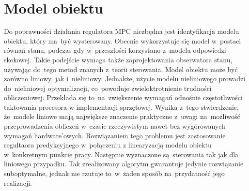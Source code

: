 \section{Model obiektu} \label{sec:model}
Do poprawności działania regulatora MPC niezbędna jest identyfikacja modelu obiektu, który ma~być wysterowany.
Obecnie wykorzystuje się model w~postaci równań stanu, podczas gdy w~przeszłości korzystano z~modelu
odpowiedzi skokowej. Takie podejście wymaga także zaprojektowania obserwatora stanu, używając do~tego
metod znanych z~teorii sterowania. Model obiektu może być zarówno liniowy, jak i~nieliniowy. Jednakże,
użycie modelu nieliniowego prowadzi do~nieliniowej optymalizacji, co~powoduje zwieloktrotnienie trudności
obliczeniowej. Przekłada się to~na~zwiększenie wymagań odnośnie częstotliwości taktowania procesora
w implementacji sprzętowej. Wynika z~tego stwierdzenie, że~modele liniowe mają największe znaczenie
praktyczne z~uwagi na~możliwość przeprowadzenia obliczeń w~czasie rzeczywistym nawet bez wygórowanych
wymagań hardware'owych. Rozwiązaniem tego problemu jest zastosowanie regultaora predykcyjnego w~połączeniu
z linearyzacją modelu obiektu w~konkretnym punkcie pracy. Następnie wyznaczone są~sterowania tak jak dla
liniowego przypadku. Tak zrealizowany algorytm gwarantuje jedynie rozwiązanie suboptymalne, jednak nie
rzutuje to~w~żaden sposób na~przydatność jego realizacji. \cite{mpc_book} \cite{mpc_pl} \cite{mpc_en}

